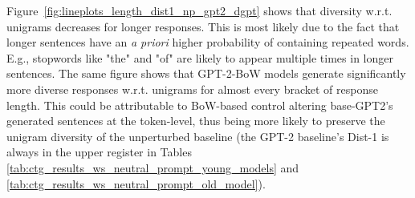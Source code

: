 
Figure~\ref{fig:lineplots_length_dist1_np_gpt2_dgpt} shows that diversity w.r.t. unigrams decreases for longer responses. This is most likely due to the fact that longer sentences have an \textit{a priori} higher probability of containing repeated words. E.g., stopwords like "the" and "of" are likely to appear multiple times in longer sentences. The same figure shows that GPT-2-BoW models generate significantly more diverse responses w.r.t. unigrams for almost every bracket of response length. This could be attributable to BoW-based control altering base-GPT2's generated sentences at the token-level, thus being more likely to preserve the unigram diversity of the unperturbed baseline (the GPT-2 baseline's Dist-1 is always in the upper register in Tables \ref{tab:ctg_results_ws_neutral_prompt_young_models} and \ref{tab:ctg_results_ws_neutral_prompt_old_model}).

